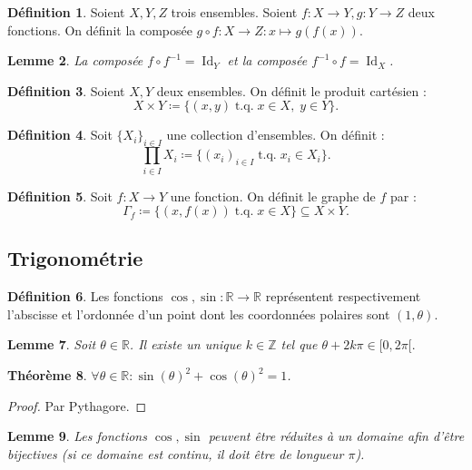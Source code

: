 \documentclass{article}
\DeclareMathOperator{\tq}{\text{ t.q. }}
\DeclareMathOperator{\Id}{Id}
\newcommand{\Z}{\mathbb Z}
\newcommand{\R}{\mathbb R}
\newtheorem{thm}{Théorème}[section]
\newtheorem{lem}[thm]{Lemme}
\theoremstyle{definition}
\newtheorem{déf}[thm]{Définition}
\theoremstyle{remark}
\begin{document}
		\begin{déf} Soient $X, Y, Z$ trois ensembles. Soient $f : X \to Y, g : Y \to Z$ deux fonctions. On définit la composée $g \circ f : X \to Z : x \mapsto g(f(x))$.\end{déf}

		\begin{lem} La composée $f \circ f^{-1} = \Id_Y$ et la composée $f^{-1} \circ f = \Id_X$. \end{lem}

		\begin{déf} Soient $X, Y$ deux ensembles. On définit le produit cartésien : \[X \times Y \coloneqq \{(x, y) \tq x \in X,\;y\in Y\}.\] \end{déf}

		\begin{déf} Soit $\{X_i\}_{i \in I}$ une collection d'ensembles. On définit : \[\prod_{i \in I} X_i \coloneqq \{(x_i)_{i \in I} \tq x_i \in X_i\}.\] \end{déf}

		\begin{déf} Soit $f : X \to Y$ une fonction. On définit le graphe de $f$ par : \[\Gamma_f \coloneqq \{(x, f(x)) \tq x \in X\} \subseteq X \times Y.\] \end{déf}

	\subsection{Trigonométrie}
		\begin{déf} Les fonctions $\cos, \sin : \R \to \R$ représentent respectivement l'abscisse et l'ordonnée d'un point dont les coordonnées polaires sont $(1, \theta)$.
		\end{déf}

		\begin{lem} Soit $\theta \in \R$. Il existe un unique $k \in \Z$ tel que $\theta + 2k\pi \in [0, 2\pi[.$\end{lem}

		\begin{thm} $\forall \theta \in \R : \sin(\theta)^2 + \cos(\theta)^2 = 1$. \end{thm}

		\begin{proof} Par Pythagore. \end{proof}

		\begin{lem} Les fonctions $\cos, \sin$ peuvent être réduites à un domaine afin d'être bijectives (si ce domaine est continu, il doit être de longueur $\pi$). \end{lem}
\end{document}
